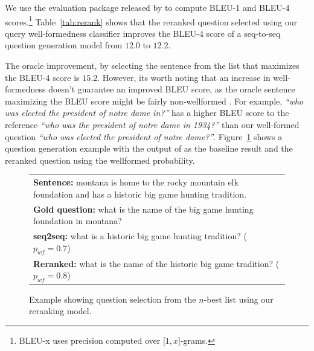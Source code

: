\documentclass[11pt,a4paper]{article}
\newcommand{\ignore}[1]{}
\begin{document}
We use the evaluation package released by  to compute
BLEU-1 and BLEU-4 scores.\footnote{BLEU-x uses precision computed over $\lbrack1, x\rbrack$-grams.} Table~\ref{tab:rerank} shows that the reranked question
selected using our query well-formedness classifier improves the BLEU-4 score of a
seq-to-seq question generation model from $12.0$ to $12.2$.
\ignore{Out of the $12$k questions in the test set, our model helped select a better
question  $449$ times which corresponds to $3.75\%$ of the total test set.}
The oracle improvement, by selecting the sentence from the list that maximizes
the BLEU-4 score is $15.2$.
However, its worth noting that an increase in well-formedness doesn't guarantee an improved
BLEU score, as the oracle sentence maximizing the BLEU score might be fairly non-wellformed
\cite{badbleu}. For example, \textit{``who was elected the president of notre dame in?''}
has a higher BLEU score to the reference \textit{``who was the president of notre dame in 1934?''}
than our well-formed question \textit{``who was elected the president of notre dame?''}.
Figure~\ref{fig:rerankexample}
shows a question generation example with the output of  
as the baseline result and the reranked question using the wellformed probability.

\begin{figure}[!tb]
\centering
\begin{tabular}{|p{7cm}|}
\hline
\textbf{Sentence:} montana is home to the rocky mountain elk foundation and has a historic big game hunting tradition.\\
\textbf{Gold question:} what is the name of the big game hunting foundation in montana?\\
\hline
\textbf{seq2seq:} what is a historic big game hunting tradition? ($p_{wf}=0.7$)\\
\textbf{Reranked:} what is the name of the historic big game tradition? ($p_{wf}=0.8$)\\
\hline
\end{tabular}
\label{fig:rerankexample}
\caption{Example showing question selection from the $n$-best list using our reranking model.}
\end{figure}
\end{document}
